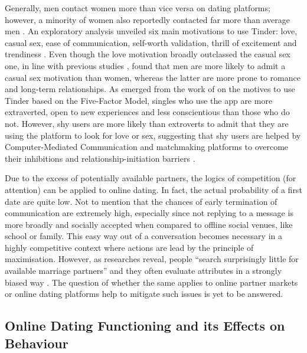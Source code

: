 Generally, men contact women more than vice versa on dating platforms;
however, a minority of women also reportedly contacted far more than
average men \citep{Scharlott1995Overcoming-Rela}. An exploratory
analysis unveiled six main motivations to use Tinder: love, casual
sex, ease of communication, self-worth validation, thrill of excitement
and trendiness \citep{Sumter2016Love-me-Tinder:}. Even though the
love motivation broadly outclassed the casual sex one, in line with
previous studies \citep[e.g.,][]{Regan2000Partner-Prefere}, \citeauthor{Sumter2016Love-me-Tinder:}
found that men are more likely to admit a casual sex motivation than
women, whereas the latter are more prone to romance and long-term
relationships. As emerged from the work of \citet{Timmermans2017To-Tinder-or-no}
on the motives to use Tinder based on the Five-Factor Model, singles
who use the app are more extraverted, open to new experiences and
less conscientious than those who do not. However, shy users are more
likely than extroverts to admit that they are using the platform to
look for love or sex, suggesting that shy users are helped by Computer-Mediated
Communication and matchmaking platforms to overcome their inhibitions
and relationship-initiation barriers \citep{Scharlott1995Overcoming-Rela}.

Due to the excess of potentially available partners, the logics of
competition (for attention) can be applied to online dating. In fact,
the actual probability of a first date are quite low. Not to mention
that the chances of early termination of communication are extremely
high, especially since not replying to a message is more broadly and
socially accepted when compared to offline social venues, like school
or family. This easy way out of a conversation becomes necessary in
a highly competitive context where actions are lead by the principle
of maximisation. However, as researches reveal, people \textquotedblleft search
surprisingly little for available marriage partners\textquotedblright{}
and they often evaluate attributes in a strongly biased way \citep{Frey1996Marriage-Parado}.
The question of whether the same applies to online partner markets
or online dating platforms help to mitigate such issues is yet to
be answered.

\subsection{Online Dating Functioning and its Effects on Behaviour}

